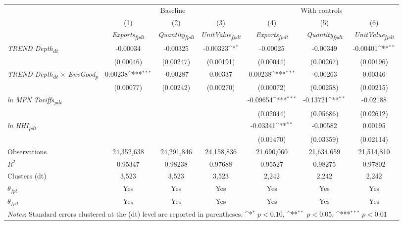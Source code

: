 {
\def\sym#1{\ifmmode^{#1}\else\(^{#1}\)\fi}
\begin{tabular}{l*{6}{c}}
\toprule
&\multicolumn{3}{c}{Baseline}&\multicolumn{3}{c}{With controls}\\\cmidrule(lr){2-4}\cmidrule(lr){5-7}
&(1)&(2)&(3)&(4)&(5)&(6)\\
&\textit{Exports\textsubscript{fpdt}}&\textit{Quantity\textsubscript{fpdt}}&\textit{UnitValue\textsubscript{fpdt}}&\textit{Exports\textsubscript{fpdt}}&\textit{Quantity\textsubscript{fpdt}}&\textit{UnitValue\textsubscript{fpdt}}\\
\midrule
\textit{TREND Depth\textsubscript{dt}} & -0.00034 & -0.00325 & -0.00323\sym{*} & -0.00025 & -0.00349 & -0.00401\sym{**}\\
 & (0.00046) & (0.00247) & (0.00191) & (0.00044) & (0.00267) & (0.00196)\\
\addlinespace
\textit{TREND Depth\textsubscript{dt} $\times$ EnvGood\textsubscript{p}} & 0.00238\sym{***} & -0.00287 & 0.00337 & 0.00238\sym{***} & -0.00263 & 0.00346\\
 & (0.00077) & (0.00242) & (0.00270) & (0.00072) & (0.00258) & (0.00215)\\
\addlinespace
\textit{ln MFN Tariffs\textsubscript{pdt}} &  &  &  & -0.09654\sym{***} & -0.13721\sym{**} & -0.02188\\
 &  &  &  & (0.02044) & (0.05686) & (0.02612)\\
\addlinespace
\textit{ln HHI\textsubscript{pdt}} &  &  &  & -0.03341\sym{**} & -0.00582 & 0.00195\\
 &  &  &  & (0.01470) & (0.03359) & (0.02114)\\
\midrule
Observations & 24,352,638 & 24,291,846 & 24,158,836 & 21,690,060 & 21,634,659 & 21,514,810\\
$R^{2}$ & 0.95347 & 0.98238 & 0.97688 & 0.95527 & 0.98275 & 0.97802\\
Clusters (dt) & 3,523 & 3,523 & 3,523 & 2,242 & 2,242 & 2,242\\
$\theta_{fpt}$ & Yes & Yes & Yes & Yes & Yes & Yes\\
$\theta_{fpd}$ & Yes & Yes & Yes & Yes & Yes & Yes\\
\bottomrule
\multicolumn{7}{l}{\footnotesize \textit{Notes}: Standard errors clustered at the (dt) level are reported in parentheses. \sym{*} \(p<0.10\), \sym{**} \(p<0.05\), \sym{***} \(p<0.01\)}\\
\end{tabular}
}

